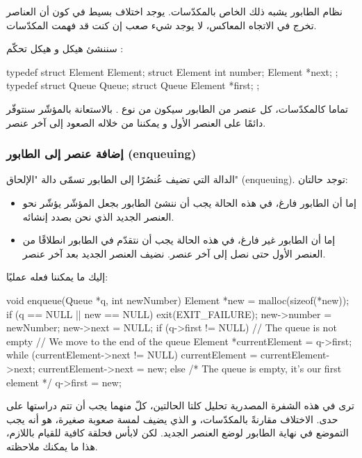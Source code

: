نظام الطابور يشبه ذلك الخاص بالمكدّسات. يوجد اختلاف بسيط في كون أن العناصر تخرج في الاتجاه المعاكس، لا يوجد شيء صعب إن كنت قد فهمت المكدّسات.

سننشئ هيكل
و هيكل تحكّم
:

\begin{Csource}
typedef struct Element Element;
struct Element
{
	int number;
	Element *next;
};
typedef struct Queue Queue;
struct Queue
{
	Element *first;
};
\end{Csource}

تماما كالمكدّسات، كل عنصر من الطابور سيكون من نوع
.
بالاستعانة بالمؤشّر 
سنتوفّر دائمًا على العنصر الأول و يمكننا من خلاله الصعود إلى آخر عنصر.

\subsubsection{إضافة عنصر إلى الطابور (\textenglish{enqueuing})}

الدالة التي تضيف عُنصُرًا إلى الطابور تسمّى دالة "الإلحاق"
(\textenglish{enqueuing}).
توجد حالتان:

\begin{itemize}
	\item إما أن الطابور فارغ، في هذه الحالة يجب أن ننشئ الطابور بجعل المؤشّر
	يؤشّر نحو العنصر الجديد الذي نحن بصدد إنشائه.
	\item إما أن الطابور غير فارغ، في هذه الحالة يجب أن نتقدّم في الطابور انطلاقًا من العنصر الأول حتى نصل إلى آخر عنصر. نضيف العنصر الجديد بعد آخر عنصر.
\end{itemize}
إليك ما يمكننا فعله عمليًا:

\begin{Csource}
void enqueue(Queue *q, int newNumber)
{
	Element *new = malloc(sizeof(*new));
	if (q == NULL || new == NULL)
	{
		exit(EXIT_FAILURE);
	}
	new->number = newNumber;
	new->next = NULL;
	if (q->first != NULL) // The queue is not empty
	{
		// We move to the end of the queue
		Element *currentElement = q->first;
		while (currentElement->next != NULL)
		{
			currentElement = currentElement->next;
		}
		currentElement->next = new;
	}
	else /* The queue is empty, it's our first element */
	{
		q->first = new;
	}
}
\end{Csource}

ترى في هذه الشفرة المصدرية تحليل كلتا الحالتين، كلّ منهما يجب أن تتم دراستها على حدى. الاختلاف مقارنةً بالمكدّسات، و الذي يضيف لمسة صعوبة صغيرة، هو أنه يجب التموضع في نهاية الطابور لوضع العنصر الجديد. لكن لابأس فحلقة
كافية للقيام باللازم، هذا ما يمكنك ملاحظته.

